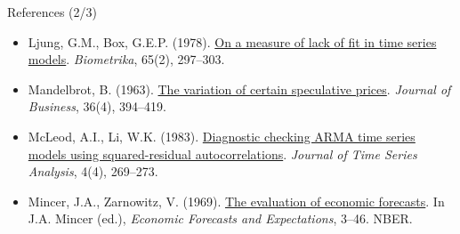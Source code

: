 \begin{frame}{References (2/3)}
\begin{itemize}
    \item Ljung, G.M., Box, G.E.P. (1978). \href{https://doi.org/10.1093/biomet/65.2.297}{On a measure of lack of fit in time series models}. \textit{Biometrika}, 65(2), 297--303.
    \item Mandelbrot, B. (1963). \href{https://doi.org/10.1086/294632}{The variation of certain speculative prices}. \textit{Journal of Business}, 36(4), 394--419.
    \item McLeod, A.I., Li, W.K. (1983). \href{https://doi.org/10.1111/j.1467-9892.1983.tb00373.x}{Diagnostic checking ARMA time series models using squared-residual autocorrelations}. \textit{Journal of Time Series Analysis}, 4(4), 269--273.
    \item Mincer, J.A., Zarnowitz, V. (1969). \href{https://www.nber.org/books-and-chapters/economic-forecasts-and-expectations-analysis-forecasting-behavior-and-performance/evaluation-economic-forecasts}{The evaluation of economic forecasts}. In J.A. Mincer (ed.), \textit{Economic Forecasts and Expectations}, 3--46. NBER.
\end{itemize}
\end{frame}

